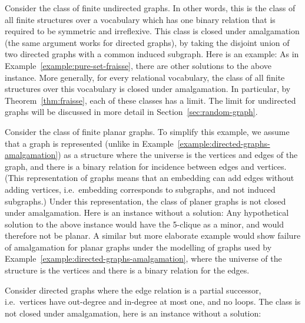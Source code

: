 \begin{myexample} 
	\label{example:directed-graphs-amalgamation}
	Consider the class of finite undirected graphs. In other words, this is the class of all finite structures over a vocabulary which has one binary relation that is required to be symmetric and irreflexive. This class is closed under amalgamation (the same argument works for directed graphs), by taking the disjoint union of two directed graphs with a common induced subgraph. Here is an example:
	As in Example~\ref{example:pure-set-fraisse}, there are other solutions to the above instance. 
		More generally, for every relational vocabulary, the class of all finite structures over this vocabulary is closed under amalgamation. In particular, by Theorem~\ref{thm:fraisse}, each of these classes has a \fraisse limit. The limit for undirected graphs will be discussed in more detail in Section~\ref{sec:random-graph}. 
\end{myexample} 
\begin{myexample}
	\label{example:planar-no-amalgamation}
	 Consider the class of finite planar graphs. To simplify this example, we assume that a graph is represented (unlike in Example~\ref{example:directed-graphs-amalgamation}) as a structure where the universe is the  vertices and edges of the graph, and there is a binary relation for incidence between edges and vertices. (This representation of graphs means that an embedding can add edges without adding vertices, i.e.~embedding corresponds to subgraphs, and not induced subgraphs.) Under this representation, the class of planer graphs is  not closed under amalgamation. Here is an instance without a solution:
	Any hypothetical solution to the above instance would have the 5-clique as a minor, and would therefore not be planar. 
	A similar but more elaborate example would show failure of amalgamation for planar graphs under the modelling of graphs used by Example~\ref{example:directed-graphs-amalgamation}, where the universe of the structure is the vertices and there is a binary relation for the edges. 
 \end{myexample}
		\begin{myexample}\label{example:successor-no-amalgamation} Consider directed graphs
			where the edge relation is a partial successor, i.e.~vertices have out-degree and in-degree at most one, and no loops. The class is not closed under amalgamation, here is an instance without a solution:
		\end{myexample}
		
